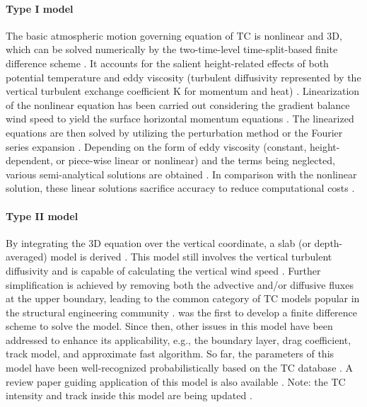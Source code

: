 \paragraph{Type I model} The basic atmospheric motion governing equation of TC is nonlinear and 3D, which can be solved numerically by the two-time-level time-split-based finite difference scheme \citep{kepert2001dynamics-ii,kepert2011choosing}. It accounts for the salient height-related effects of both potential temperature and eddy viscosity (turbulent diffusivity represented by the vertical turbulent exchange coefficient K for momentum and heat) \citep{kepert2001dynamics-ii, kepert2010slab-ii}. Linearization of the nonlinear equation has been carried out considering the gradient balance wind speed to yield the surface horizontal momentum equations \citep{kepert2001dynamics-i}. The linearized equations are then solved by utilizing the perturbation method \citep{meng1995analytical} or the Fourier series expansion \citep{kepert2001dynamics-i}. Depending on the form of eddy viscosity (constant, height-dependent, or piece-wise linear or nonlinear) and the terms being neglected, various semi-analytical solutions are obtained \citep{fang2018novel, huang2013prediction, kepert2006observed, meng1995analytical, meng1997numerical, snaiki2017linear}. In comparison with the nonlinear solution, these linear solutions sacrifice accuracy to reduce computational costs \citep{kepert2014reply}. 

\paragraph{Type II model} By integrating the 3D equation over the vertical coordinate, a slab (or depth-averaged) model is derived \citep{kepert2010slab-i}. This model still involves the vertical turbulent diffusivity and is capable of calculating the vertical wind speed \citep{langousis2008extreme, smith1968surface, smith2008simple}. Further simplification is achieved by removing both the advective and/or diffusive fluxes at the upper boundary, leading to the common category of TC models popular in the structural engineering community \citep{powell2005state, shapiro1983asymmetric, vickery2000hurricane, vickery2009hurricane-b}. \cite{chow1971study} was the first to develop a finite difference scheme to solve the model. Since then, other issues in this model have been addressed to enhance its applicability, e.g., the boundary layer, drag coefficient, track model, and approximate fast algorithm. So far, the parameters of this model have been well-recognized probabilistically based on the TC database \citep{vickery2008statistical}. A review paper guiding application of this model is also available \citep{vickery2009hurricane-a}. Note: the TC intensity and track inside this model are being updated \citep{mudd2015development, vickery2010synthetic}. 

